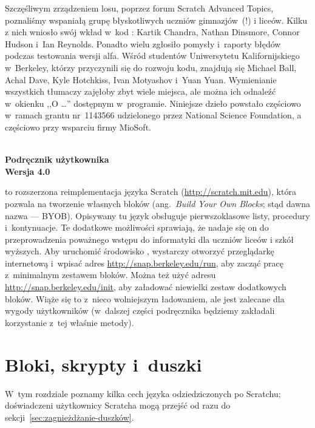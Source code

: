 \documentclass{report}
\begin{document}
Szczęśliwym zrządzeniem losu, poprzez forum Scratch Advanced Topics, poznaliśmy wspaniałą grupę błyskotliwych uczniów gimnazjów~(!\@) i liceów. Kilku z nich wniosło swój wkład w~kod : Kartik Chandra, Nathan Dinsmore, Connor Hudson i~Ian Reynolds. Ponadto wielu zgłosiło pomysły i~raporty błędów podczas testowania wersji alfa. Wśród studentów Uniwersytetu Kalifornijskiego w~Berkeley, którzy przyczynili się do rozwoju kodu, znajdują się Michael Ball, Achal Dave, Kyle Hotchkiss, Ivan Motyashov i~Yuan Yuan. Wymienianie wszystkich tłumaczy zajęłoby zbyt wiele miejsca, ale można ich odnaleźć w~okienku ,,O \Snap{}\ldots'' dostępnym w~programie. Niniejsze dzieło powstało częściowo w~ramach grantu nr~1143566 udzielonego przez National Science Foundation, a częściowo przy wsparciu firmy MioSoft.

\clearpage

\begin{center}
\bf \Huge \Snap{} \\
Podręcznik użytkownika \\
\huge Wersja 4.0 \vspace{40pt}
\end{center}

\Snap{} to rozszerzona reimplementacja języka Scratch (\url{http://scratch.mit.edu}), która pozwala na tworzenie własnych bloków (ang.\ \textit{Build Your Own Blocks}; stąd dawna nazwa  --- BYOB). Opisywany tu język obsługuje pierwszoklasowe listy, procedury i~kontynuacje. Te dodatkowe możliwości sprawiają, że nadaje się on do przeprowadzenia poważnego wstępu do informatyki dla uczniów liceów i szkół wyższych. Aby uruchomić środowisko \Snap{}, wystarczy otworzyć przeglądarkę internetową i~wpisać adres \url{http://snap.berkeley.edu/run}, aby zacząć pracę z~minimalnym zestawem bloków. Można też użyć adresu \url{http://snap.berkeley.edu/init}, aby załadować niewielki zestaw dodatkowych bloków. Wiąże się to z~nieco wolniejszym ładowaniem, ale jest zalecane dla wygody użytkowników (w~dalszej części podręcznika będziemy zakładali korzystanie z~tej właśnie metody).

\clearpage

\chapter{Bloki, skrypty i~duszki}

W~tym rozdziale poznamy kilka cech języka \Snap{} odziedziczonych po Scratchu; doświadczeni użytkownicy Scratcha mogą przejść od razu do sekcji~\ref{sec:zagnieżdżanie-duszków}.
\end{document}
